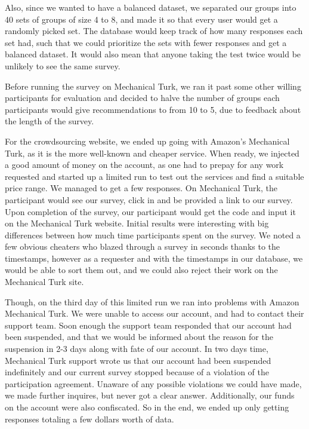 Also, since we wanted to have a balanced dataset, we separated our groups into 40 sets of groups of size 4 to 8, and made it so that every user would get a randomly picked set. The database would keep track of how many responses each set had, such that we could prioritize the sets with fewer responses and get a balanced dataset. It would also mean that anyone taking the test twice would be unlikely to see the same survey.

Before running the survey on Mechanical Turk, we ran it past some other willing participants for evaluation and decided to halve the number of groups each participants would give recommendations to from 10 to 5, due to feedback about the length of the survey.


For the crowdsourcing website, we ended up going with Amazon's Mechanical Turk, as it is the more well-known and cheaper service. When ready, we injected a good amount of money on the account, as one had to prepay for any work requested and started up a limited run to test out the services and find a suitable price range. We managed to get a few responses. On Mechanical Turk, the participant would see our survey, click in and be provided a link to our survey. Upon completion of the survey, our participant would get the code and input it on the Mechanical Turk website. Initial results were interesting with big differences between how much time participants spent on the survey. We noted a few obvious cheaters who blazed through a survey in seconds thanks to the timestamps, however as a requester and with the timestamps in our database, we would be able to sort them out, and we could also reject their work on the Mechanical Turk site.

Though, on the third day of this limited run we ran into problems with Amazon Mechanical Turk. We were unable to access our account, and had to contact their support team. Soon enough the support team responded that our account had been suspended, and that we would be informed about the reason for the suspension in 2-3 days along with fate of our account. In two days time, Mechanical Turk support wrote us that our account had been suspended indefinitely and our current survey stopped because of a violation of the participation agreement. Unaware of any possible violations we could have made, we made further inquires, but never got a clear answer. Additionally, our funds on the account were also confiscated. So in the end, we ended up only getting responses totaling a few dollars worth of data.

